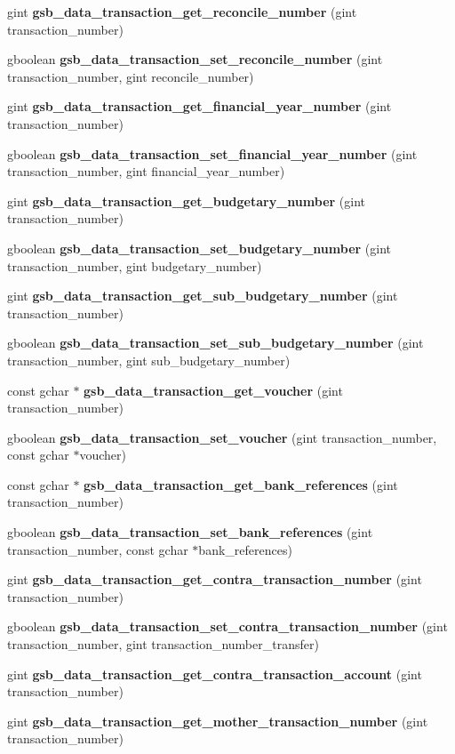 \begin{DoxyCompactItemize}
\item 
gint {\bf gsb\_\-data\_\-transaction\_\-get\_\-reconcile\_\-number} (gint transaction\_\-number)
\item 
gboolean {\bf gsb\_\-data\_\-transaction\_\-set\_\-reconcile\_\-number} (gint transaction\_\-number, gint reconcile\_\-number)
\item 
gint {\bf gsb\_\-data\_\-transaction\_\-get\_\-financial\_\-year\_\-number} (gint transaction\_\-number)
\item 
gboolean {\bf gsb\_\-data\_\-transaction\_\-set\_\-financial\_\-year\_\-number} (gint transaction\_\-number, gint financial\_\-year\_\-number)
\item 
gint {\bf gsb\_\-data\_\-transaction\_\-get\_\-budgetary\_\-number} (gint transaction\_\-number)
\item 
gboolean {\bf gsb\_\-data\_\-transaction\_\-set\_\-budgetary\_\-number} (gint transaction\_\-number, gint budgetary\_\-number)
\item 
gint {\bf gsb\_\-data\_\-transaction\_\-get\_\-sub\_\-budgetary\_\-number} (gint transaction\_\-number)
\item 
gboolean {\bf gsb\_\-data\_\-transaction\_\-set\_\-sub\_\-budgetary\_\-number} (gint transaction\_\-number, gint sub\_\-budgetary\_\-number)
\item 
const gchar $\ast$ {\bf gsb\_\-data\_\-transaction\_\-get\_\-voucher} (gint transaction\_\-number)
\item 
gboolean {\bf gsb\_\-data\_\-transaction\_\-set\_\-voucher} (gint transaction\_\-number, const gchar $\ast$voucher)
\item 
const gchar $\ast$ {\bf gsb\_\-data\_\-transaction\_\-get\_\-bank\_\-references} (gint transaction\_\-number)
\item 
gboolean {\bf gsb\_\-data\_\-transaction\_\-set\_\-bank\_\-references} (gint transaction\_\-number, const gchar $\ast$bank\_\-references)
\item 
gint {\bf gsb\_\-data\_\-transaction\_\-get\_\-contra\_\-transaction\_\-number} (gint transaction\_\-number)
\item 
gboolean {\bf gsb\_\-data\_\-transaction\_\-set\_\-contra\_\-transaction\_\-number} (gint transaction\_\-number, gint transaction\_\-number\_\-transfer)
\item 
gint {\bf gsb\_\-data\_\-transaction\_\-get\_\-contra\_\-transaction\_\-account} (gint transaction\_\-number)
\item 
gint {\bf gsb\_\-data\_\-transaction\_\-get\_\-mother\_\-transaction\_\-number} (gint transaction\_\-number)

\end{DoxyCompactItemize}
